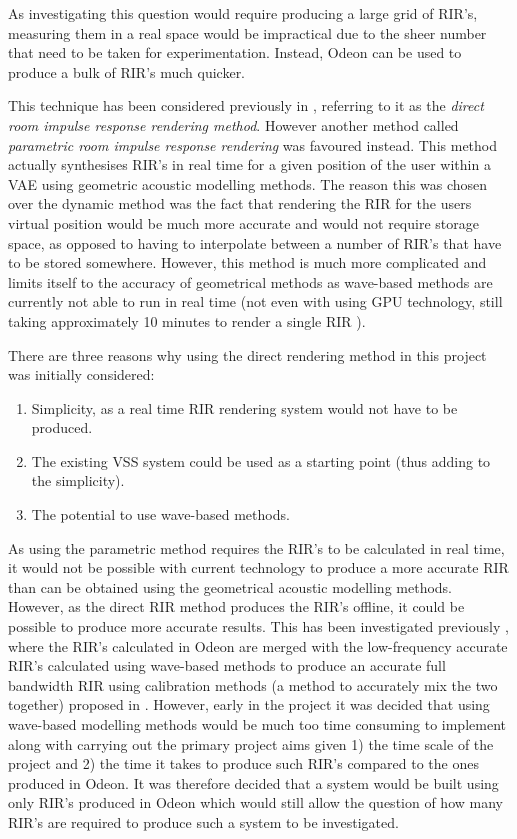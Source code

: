 \documentclass[../../main.tex]{subfiles}
\begin{document}
		 As investigating this question would require producing a large grid of \ac{RIR}'s, measuring them in a real space would be impractical due to the sheer number that need to be taken for experimentation. Instead, Odeon can be used to produce a bulk of \ac{RIR}'s much quicker.

		This technique has been considered previously in \cite{Savioja1999}, referring to it as the \textit{direct room impulse response rendering method}. However another method called \textit{parametric room impulse response rendering} was favoured instead. This method actually synthesises \ac{RIR}'s in real time for a given position of the user within a \ac{VAE} using geometric acoustic modelling methods. The reason this was chosen over the dynamic method was the fact that rendering the \ac{RIR} for the users virtual position would be much more accurate and would not require storage space, as opposed to having to interpolate between a number of \ac{RIR}'s that have to be stored somewhere. However, this method is much more complicated and limits itself to the accuracy of geometrical methods as wave-based methods are currently not able to run in real time (not even with using GPU technology, still taking approximately 10 minutes to render a single \ac{RIR} \cite{Mehra2010}).

		There are three reasons why using the direct rendering method in this project was initially considered: 
		\begin{enumerate}
			\item Simplicity, as a real time \ac{RIR} rendering system would not have to be produced.
			\item The existing \ac{VSS} system could be used as a starting point (thus adding to the simplicity).
			\item The potential to use wave-based methods.
		\end{enumerate}

		As using the parametric method requires the \ac{RIR}'s to be calculated in real time, it would not be possible with current technology to produce a more accurate \ac{RIR} than can be obtained using the geometrical acoustic modelling methods. However, as the direct \ac{RIR} method produces the \ac{RIR}'s offline, it could be possible to produce more accurate results. This has been investigated previously \cite{Oxnard2013}, where the \ac{RIR}'s calculated in Odeon are merged with the low-frequency accurate \ac{RIR}'s calculated using wave-based methods to produce an accurate full bandwidth \ac{RIR} using calibration methods (a method to accurately mix the two together) proposed in \cite{Southern}. However, early in the project it was decided that using wave-based modelling methods would be much too time consuming to implement along with carrying out the primary project aims given 1) the time scale of the project and 2) the time it takes to produce such \ac{RIR}'s compared to the ones produced in Odeon. It was therefore decided that a system would be built using only \ac{RIR}'s produced in Odeon which would still allow the question of how many \ac{RIR}'s are required to produce such a system to be investigated.
\end{document}
